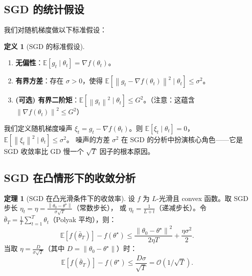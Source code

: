 \documentclass[12pt,a4paper]{ctexart}
\theoremstyle{definition}
\newtheorem{definition}{定义}[section]
\newtheorem{theorem}{定理}[section]
\theoremstyle{plain}
\newcommand{\E}{\mathbb{E}}
\newcommand{\grad}{\nabla}
\newcommand{\norm}[1]{\left\lVert #1 \right\rVert}
\begin{document}
\subsection{SGD 的统计假设}

我们对随机梯度做以下标准假设：

\begin{definition}[SGD 的标准假设]
  \begin{enumerate}[label=(A\arabic*)]
    \item \textbf{无偏性}：$\E[g_t \mid \theta_t] = \grad f(\theta_t)$。
    \item \textbf{有界方差}：存在 $\sigma > 0$，使得 $\E[\norm{g_t - \grad f(\theta_t)}^2 \mid \theta_t] \le \sigma^2$。
    \item \textbf{(可选) 有界二阶矩}：$\E[\norm{g_t}^2 \mid \theta_t] \le G^2$。（注意：这蕴含 $\norm{\grad f(\theta_t)}^2 \le G^2$）
  \end{enumerate}
\end{definition}

我们定义随机梯度噪声 $\xi_t = g_t - \grad f(\theta_t)$。则 $\E[\xi_t \mid \theta_t] = 0$，$\E[\norm{\xi_t}^2 \mid \theta_t] \le \sigma^2$。
噪声的方差 $\sigma^2$ 在 SGD 的分析中扮演核心角色——它是 SGD 收敛率比 GD 慢一个 $\sqrt{T}$ 因子的根本原因。

\subsection{SGD 在凸情形下的收敛分析}

\begin{theorem}[SGD 在凸光滑条件下的收敛率]\label{thm:sgd-convex}
  设 $f$ 为 $L$-光滑且 convex 函数。取 SGD 步长 $\eta_t = \eta = \frac{\norm{\theta_0 - \theta^\star}}{\sigma\sqrt{T}}$（常数步长），
  或 $\eta_t = \frac{1}{L + t}$（递减步长）。令 $\bar\theta_T = \frac{1}{T}\sum_{t=1}^T \theta_t$（Polyak 平均），则：
  \begin{equation}\label{eq:sgd-convex-rate}
    \E[f(\bar\theta_T)] - f(\theta^\star) \le \frac{\norm{\theta_0 - \theta^\star}^2}{2\eta T} + \frac{\eta \sigma^2}{2}.
  \end{equation}
  当取 $\eta = \frac{D}{\sigma\sqrt{T}}$（其中 $D = \norm{\theta_0 - \theta^\star}$）时：
  \begin{equation}
    \E[f(\bar\theta_T)] - f(\theta^\star) \le \frac{D\sigma}{\sqrt{T}} = \mathcal{O}(1/\sqrt{T}).
  \end{equation}
\end{theorem}
\end{document}
